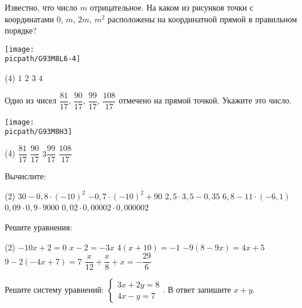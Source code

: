 \begin{homework}[number=3]
	\begin{listofex}
		\item Известно, что число \( m \) отрицательное. На каком из рисунков точки с координатами \( 0 \), \( m \), \( 2m \), \( m^2 \) расположены на координатной прямой в правильном порядке?
		\begin{center}
			\texttt{[image: \\picpath/G93M8L6-4]}
		\end{center}
		\begin{tasks}(4)
			\task \( 1 \)
			\task \( 2 \)
			\task \( 3 \)
			\task \( 4 \)
		\end{tasks}
		\item Одно из чисел \( \dfrac{81}{17} \), \( \dfrac{90}{17} \), \( \dfrac{99}{17} \), \( \dfrac{108}{17} \) отмечено на прямой точкой. Укажите это число.
		\begin{center}
			\texttt{[image: \\picpath/G93M8H3]}
		\end{center}
		\begin{tasks}(4)
			\task \( \dfrac{81}{17} \)
			\task \( \dfrac{90}{17} \)
			\task \( 3 \)\( \dfrac{99}{17} \)
			\task \(\dfrac{108}{17}\)
		\end{tasks}
		\item Вычислите:
		\begin{tasks}(2)
			\task \( 30-0,8\cdot(-10)^2 \)
			\task \( -0,7\cdot(-10)^2+90 \)
			\task \( 2,5\cdot3,5-0,35 \)
			\task \( 6,8-11\cdot(-6,1) \)
			\task \( 0,09\cdot0,9\cdot9000 \)
			\task \( 0,02\cdot0,00002\cdot0,000002\)
		\end{tasks}
		\item Решите уравнения:
		\begin{tasks}(2)
			\task \( -10x+2=0 \)
			\task \( x-2=-3x \)
			\task \( 4(x+10)=-1 \)
			\task \( -9(8-9x)=4x+5 \)
			\task \( 9-2(-4x+7)=7 \)
			\task \( \dfrac{x}{12}+\dfrac{x}{8}+x=-\dfrac{29}{6} \)
		\end{tasks}
		\item Решите систему уравнений: \(\begin{cases}  3x+2y=8  \\  4x-y=7 \end{cases}\). В ответ запишите \( x+y \).
	\end{listofex}
\end{homework}

